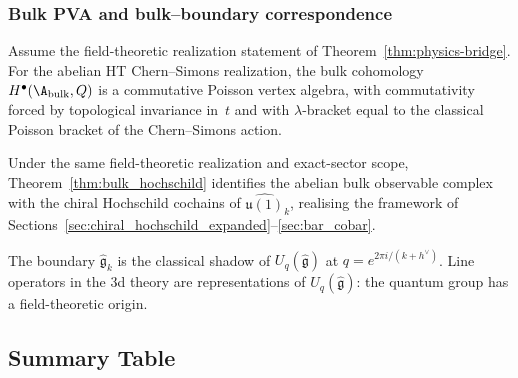 \subsubsection{Bulk PVA and bulk--boundary correspondence}

\begin{proposition}
Assume the field-theoretic realization statement of
Theorem~\ref{thm:physics-bridge}. For the abelian HT Chern--Simons
realization, the bulk cohomology $H^\bullet(\A_{\mathrm{bulk}}, Q)$ is
a commutative Poisson vertex algebra, with commutativity forced by
topological invariance in~$t$ and with $\lambda$-bracket equal to the
classical Poisson bracket of the Chern--Simons action.
\end{proposition}

Under the same field-theoretic realization and exact-sector scope,
Theorem~\ref{thm:bulk_hochschild} identifies the abelian bulk
observable complex with the chiral Hochschild cochains of
$\widehat{\mathfrak{u}(1)}_k$, realising the framework of
Sections~\ref{sec:chiral_hochschild_expanded}--\ref{sec:bar_cobar}.

\begin{remark}
The boundary $\widehat{\mathfrak{g}}_k$ is the classical shadow of $U_q(\widehat{\mathfrak{g}})$ at $q = e^{2\pi i/(k + h^\vee)}$. Line operators in the 3d theory are representations of $U_q(\widehat{\mathfrak{g}})$: the quantum group has a field-theoretic origin.
\end{remark}

\subsection{Summary Table}

